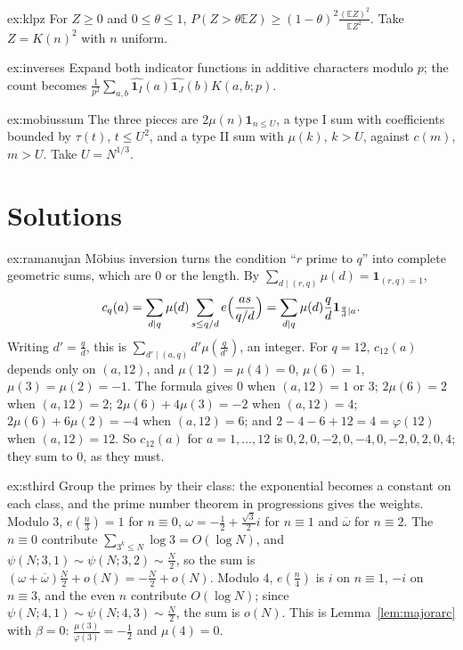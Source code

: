 \begin{hint}{ex:klpz}
For $Z\ge0$ and $0\le\theta\le1$, $P(Z>\theta\mathbb EZ)\ge(1-\theta)^2\frac{(\mathbb EZ)^2}{\mathbb EZ^2}$. Take $Z=K(n)^2$ with $n$ uniform.
\end{hint}

\begin{hint}{ex:inverses}
Expand both indicator functions in additive characters modulo $p$; the count becomes $\frac1{p^2}\sum_{a,b}\widehat{\mathbf 1_I}(a)\widehat{\mathbf 1_J}(b)K(a,b;p)$.
\end{hint}

\begin{hint}{ex:mobiussum}
The three pieces are $2\mu(n)\mathbf 1_{n\le U}$, a type I sum with coefficients bounded by $\tau(t)$, $t\le U^2$, and a type II sum with $\mu(k)$, $k>U$, against $c(m)$, $m>U$. Take $U=N^{1/3}$.
\end{hint}

\section{Solutions}

\begin{solution}{ex:ramanujan}
\idea Möbius inversion turns the condition ``$r$ prime to $q$'' into complete geometric sums, which are $0$ or the length.
\writeup By $\sum_{d\mid(r,q)}\mu(d)=\mathbf 1_{(r,q)=1}$,
\[
c_q(a)=\sum_{d\mid q}\mu(d)\sum_{s\le q/d}e\Bigl(\frac{as}{q/d}\Bigr)=\sum_{d\mid q}\mu(d)\frac qd\mathbf 1_{\frac qd\mid a}.
\]
Writing $d'=\frac qd$, this is $\sum_{d'\mid(a,q)}d'\mu(\frac q{d'})$, an integer. For $q=12$, $c_{12}(a)$ depends only on $(a,12)$, and $\mu(12)=\mu(4)=0$, $\mu(6)=1$, $\mu(3)=\mu(2)=-1$. The formula gives $0$ when $(a,12)=1$ or $3$; $2\mu(6)=2$ when $(a,12)=2$; $2\mu(6)+4\mu(3)=-2$ when $(a,12)=4$; $2\mu(6)+6\mu(2)=-4$ when $(a,12)=6$; and $2-4-6+12=4=\varphi(12)$ when $(a,12)=12$. So $c_{12}(a)$ for $a=1,\dots,12$ is $0,2,0,-2,0,-4,0,-2,0,2,0,4$; they sum to $0$, as they must.
\end{solution}

\begin{solution}{ex:sthird}
\idea Group the primes by their class: the exponential becomes a constant on each class, and the prime number theorem in progressions gives the weights.
\writeup Modulo $3$, $e(\frac n3)=1$ for $n\equiv0$, $\omega=-\frac12+\frac{\sqrt3}2i$ for $n\equiv1$ and $\overline\omega$ for $n\equiv2$. The $n\equiv0$ contribute $\sum_{3^k\le N}\log3=O(\log N)$, and $\psi(N;3,1)\sim\psi(N;3,2)\sim\frac N2$, so the sum is $(\omega+\overline\omega)\frac N2+o(N)=-\frac N2+o(N)$. Modulo $4$, $e(\frac n4)$ is $i$ on $n\equiv1$, $-i$ on $n\equiv3$, and the even $n$ contribute $O(\log N)$; since $\psi(N;4,1)\sim\psi(N;4,3)\sim\frac N2$, the sum is $o(N)$. This is Lemma~\ref{lem:majorarc} with $\beta=0$: $\frac{\mu(3)}{\varphi(3)}=-\frac12$ and $\mu(4)=0$.
\end{solution}

